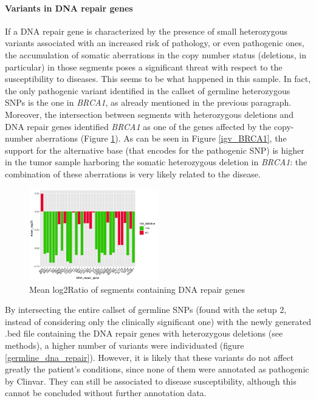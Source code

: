 \documentclass[11pt]{article}
\begin{document}
\paragraph{Variants in DNA repair genes}

If a DNA repair gene is characterized by the presence of small heterozygous variants associated with an increased risk of pathology, or even pathogenic ones, the accumulation of somatic aberrations in the copy number status (deletions, in particular) in those segments poses a significant threat with respect to the susceptibility to diseases. This seems to be what happened in this sample.
In fact, the only pathogenic variant identified in the callset of germline heterozygous SNPs is the one in \emph{BRCA1}, as already mentioned in the previous paragraph. Moreover, the intersection between segments with heterozygous deletions and DNA repair genes identified \emph{BRCA1} as one of the genes affected by the copy-number aberrations (Figure \ref{SCNA_DNARepair}). As can be seen in Figure \ref{igv_BRCA1}, the support for the alternative base (that encodes for the pathogenic SNP) is higher in the tumor sample harboring the somatic heterozygous deletion in \emph{BRCA1}: the combination of these aberrations is very likely related to the disease.

\begin{figure}[H]
   \centering
   \includegraphics[width=0.5\textwidth]{images/SCNA_DNARepairGenes.png}
   \caption{\footnotesize{Mean log2Ratio of segments containing DNA repair genes}}
   \label{SCNA_DNARepair}
\end{figure}

By intersecting the entire callset of germline SNPs (found with the setup 2, instead of considering only the clinically significant one) with the newly generated .bed file containing the DNA repair genes with heterozygous deletions (see methods), a higher number of variants were individuated (figure \ref{germline_dna_repair}). However, it is likely that these variants do not affect greatly the patient's conditions, since none of them were annotated as pathogenic by Clinvar. They can still be associated to disease susceptibility, although this cannot be concluded without further annotation data.
\end{document}
